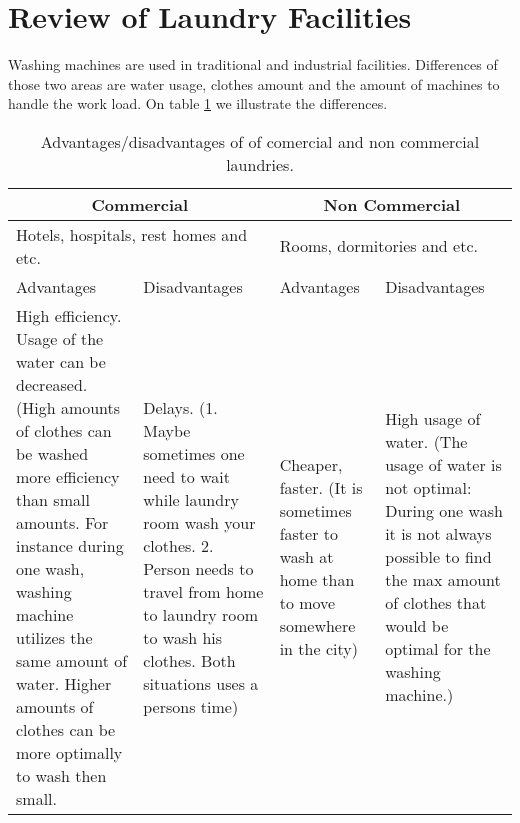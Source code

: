 \section{Review of Laundry Facilities}
Washing machines are used in traditional and industrial facilities. Differences of those two areas are water usage, clothes amount and the amount of machines to handle the work load. On table \ref{tab:AdDis} we illustrate the differences.

\begin{table}[h]
	\centering
    \begin{tabular}{ | p{3.5cm} | p{3.5cm} | p{3.5cm} | p{3.5cm} |}
    \hline
    \multicolumn{2}{|c|}{\textbf{Commercial}} & \multicolumn{2}{|c|}{\textbf{Non Commercial}} \\ \hline
    \multicolumn{2}{|l|}{Hotels, hospitals, rest homes and etc.} & \multicolumn{2}{|l|}{Rooms, dormitories and etc.} \\ \hline
    Advantages & Disadvantages & Advantages & Disadvantages \\ \hline
    High efficiency. Usage of the water can be decreased. (High amounts of clothes can be washed more efficiency than small amounts. For instance during one wash, washing machine utilizes the same amount of water. Higher amounts of clothes can be more optimally to wash then small. & Delays. (1. Maybe sometimes one need to wait while laundry room wash your clothes. 2. Person needs to travel from home to laundry room to wash his clothes. Both situations uses a persons time) & Cheaper, faster. (It is sometimes faster to wash at home than to move somewhere in the city) & High usage of water. (The usage of water is not optimal: During one wash it is not always possible to find the max amount of clothes that would be optimal for the washing machine.) \\ \hline
    \end{tabular}
	\caption{Advantages/disadvantages of of comercial and non commercial laundries.}
	\label{tab:AdDis}
\end{table}